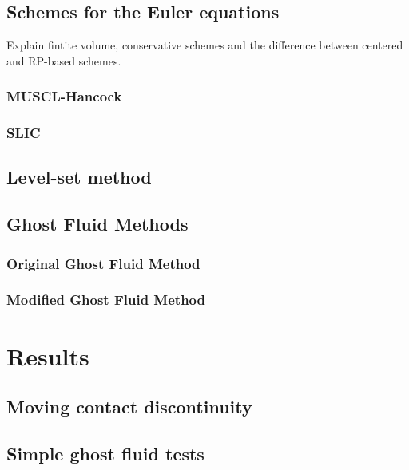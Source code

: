 \documentclass[final,3p,twocolumn,times]{elsarticle}
\begin{document}
\subsection{Schemes for the Euler equations}
\label{subsec:eulerschemes}

Explain fintite volume, conservative schemes and the difference between
centered and RP-based schemes. 

\subsubsection{MUSCL-Hancock}
\label{subsubsec:muscl}

\subsubsection{SLIC}
\label{subsubsec:slic}

\subsection{Level-set method}
\label{subsec:levelset}

\subsection{Ghost Fluid Methods}
\label{subsec:ghostfluid}

\subsubsection{Original Ghost Fluid Method}
\label{subsubsec:ogfm}

\subsubsection{Modified Ghost Fluid Method}
\label{subsubsec:mgfm}

\section{Results}
\label{sec:results}

\subsection{Moving contact discontinuity}
\label{subsec:moving}

\subsection{Simple ghost fluid tests}
\label{subsec:toro}
\end{document}
